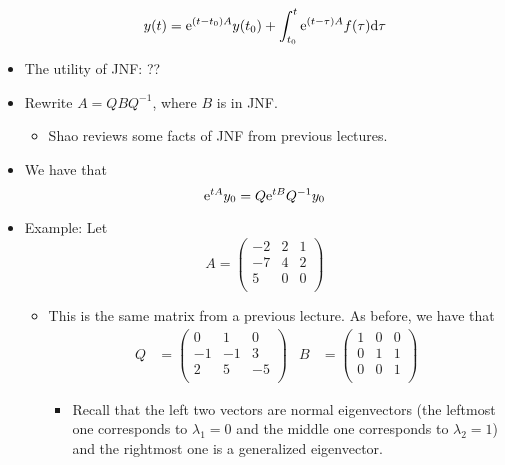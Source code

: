 \documentclass[../notes.tex]{subfiles}
\begin{document}
\begin{itemize}
    \begin{equation*}
        y(t) = \e[(t-t_0)A]y(t_0)+\int_{t_0}^t\e[(t-\tau)A]f(\tau)\dd\tau
    \end{equation*}
    \item The utility of JNF: ??
    \item Rewrite $A=QBQ^{-1}$, where $B$ is in JNF.
    \begin{itemize}
        \item Shao reviews some facts of JNF from previous lectures.
    \end{itemize}
    \item We have that
    \begin{equation*}
        \e[tA]y_0 = Q\e[tB]Q^{-1}y_0
    \end{equation*}
    \item Example: Let
    \begin{equation*}
        A =
        \begin{pmatrix}
            -2 & 2 & 1\\
            -7 & 4 & 2\\
            5 & 0 & 0\\
        \end{pmatrix}
    \end{equation*}
    \begin{itemize}
        \item This is the same matrix from a previous lecture. As before, we have that
        \begin{align*}
            Q &=
            \begin{pmatrix}
                0 & 1 & 0\\
                -1 & -1 & 3\\
                2 & 5 & -5\\
            \end{pmatrix}&
            B &=
            \begin{pmatrix}
                1 & 0 & 0\\
                0 & 1 & 1\\
                0 & 0 & 1\\
            \end{pmatrix}
        \end{align*}
        \begin{itemize}
            \item Recall that the left two vectors are normal eigenvectors (the leftmost one corresponds to $\lambda_1=0$ and the middle one corresponds to $\lambda_2=1$) and the rightmost one is a generalized eigenvector.

\end{itemize}
\end{itemize}
\end{itemize}
\end{document}
